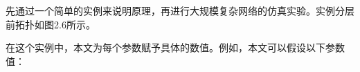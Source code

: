 \documentclass[UTF8,a4paper,12pt]{ctexart}
\numberwithin{equation}{section}
\begin{document}
先通过一个简单的实例来说明原理，再进行大规模复杂网络的仿真实验。实例分层前拓扑如图2.6所示。
\begin{figure}[htb]
\end{figure}

在这个实例中，本文为每个参数赋予具体的数值。例如，本文可以假设以下参数值：
\end{document}
